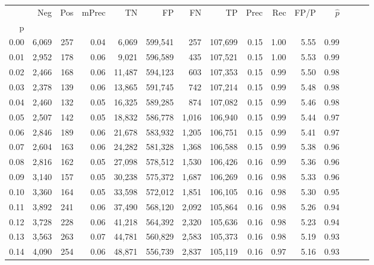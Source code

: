 \begin{tabular}{rrrrrrrrrrrrrrr}
\toprule
{} &     Neg &    Pos & mPrec &       TN &       FP &       FN &       TP &  Prec &   Rec &  FP/P & $\hat{p}$ \\
p    &         &        &       &          &          &          &          &       &       &       &           \\
\midrule
0.00 &   6,069 &    257 &  0.04 &    6,069 &  599,541 &      257 &  107,699 &  0.15 &  1.00 &  5.55 &      0.99 \\
0.01 &   2,952 &    178 &  0.06 &    9,021 &  596,589 &      435 &  107,521 &  0.15 &  1.00 &  5.53 &      0.99 \\
0.02 &   2,466 &    168 &  0.06 &   11,487 &  594,123 &      603 &  107,353 &  0.15 &  0.99 &  5.50 &      0.98 \\
0.03 &   2,378 &    139 &  0.06 &   13,865 &  591,745 &      742 &  107,214 &  0.15 &  0.99 &  5.48 &      0.98 \\
0.04 &   2,460 &    132 &  0.05 &   16,325 &  589,285 &      874 &  107,082 &  0.15 &  0.99 &  5.46 &      0.98 \\
0.05 &   2,507 &    142 &  0.05 &   18,832 &  586,778 &    1,016 &  106,940 &  0.15 &  0.99 &  5.44 &      0.97 \\
0.06 &   2,846 &    189 &  0.06 &   21,678 &  583,932 &    1,205 &  106,751 &  0.15 &  0.99 &  5.41 &      0.97 \\
0.07 &   2,604 &    163 &  0.06 &   24,282 &  581,328 &    1,368 &  106,588 &  0.15 &  0.99 &  5.38 &      0.96 \\
0.08 &   2,816 &    162 &  0.05 &   27,098 &  578,512 &    1,530 &  106,426 &  0.16 &  0.99 &  5.36 &      0.96 \\
0.09 &   3,140 &    157 &  0.05 &   30,238 &  575,372 &    1,687 &  106,269 &  0.16 &  0.98 &  5.33 &      0.96 \\
0.10 &   3,360 &    164 &  0.05 &   33,598 &  572,012 &    1,851 &  106,105 &  0.16 &  0.98 &  5.30 &      0.95 \\
0.11 &   3,892 &    241 &  0.06 &   37,490 &  568,120 &    2,092 &  105,864 &  0.16 &  0.98 &  5.26 &      0.94 \\
0.12 &   3,728 &    228 &  0.06 &   41,218 &  564,392 &    2,320 &  105,636 &  0.16 &  0.98 &  5.23 &      0.94 \\
0.13 &   3,563 &    263 &  0.07 &   44,781 &  560,829 &    2,583 &  105,373 &  0.16 &  0.98 &  5.19 &      0.93 \\
0.14 &   4,090 &    254 &  0.06 &   48,871 &  556,739 &    2,837 &  105,119 &  0.16 &  0.97 &  5.16 &      0.93 \\

\end{tabular}
